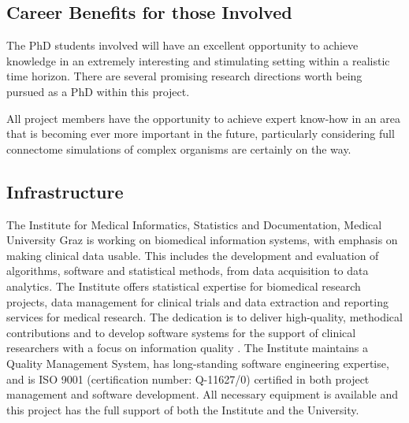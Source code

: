 \documentclass[a4paper,11pt]{article}
\begin{document}
\subsection{Career Benefits for those Involved}

The PhD students involved will have an excellent opportunity to achieve knowledge in an extremely interesting and stimulating setting within a realistic time horizon. There are several promising research directions worth being pursued as a PhD within this project. 

All project members have the opportunity to achieve expert know-how in an area that is becoming ever more important in the future, particularly considering full connectome simulations of complex organisms are certainly on the way.

\subsection{Infrastructure} 

The Institute for Medical Informatics, Statistics and Documentation, Medical University Graz is working on biomedical information systems, with emphasis on making clinical data usable. This includes the development and evaluation of algorithms, software and statistical methods, from data acquisition to data analytics. The Institute offers statistical expertise for biomedical research projects, data management for clinical trials and data extraction and reporting services for medical research. The dedication is to deliver high-quality, methodical contributions and to develop software systems for the support of clinical researchers with a focus on information quality \citep{Holzinger:2011:InformationQuality}. The Institute maintains a Quality Management System, has long-standing software engineering expertise, and is ISO 9001 (certification number: Q-11627/0) certified in both project management and software development. All necessary equipment is available and this project has the full support of both the Institute and the University.
\end{document}
